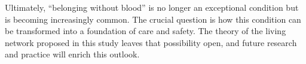 Ultimately, “belonging without blood” is no longer an exceptional condition but is becoming increasingly common. The crucial question is how this condition can be transformed into a foundation of care and safety. The theory of the living network proposed in this study leaves that possibility open, and future research and practice will enrich this outlook.  
















